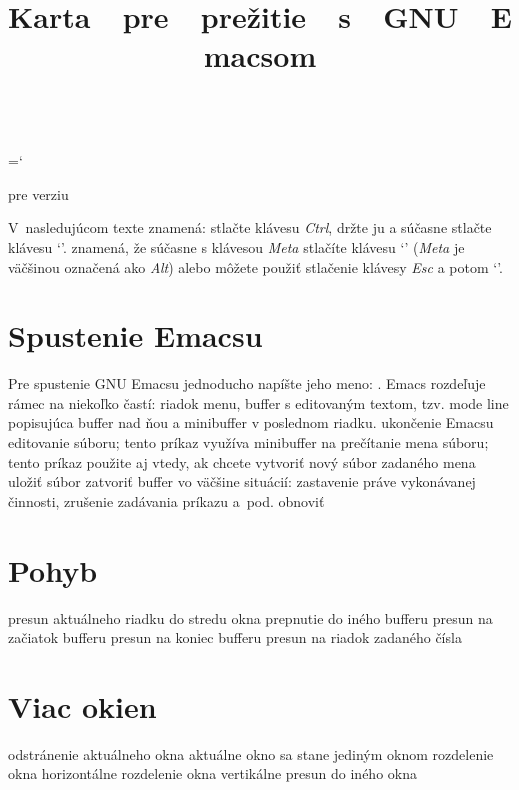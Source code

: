 \chardef\\=`\\

\raggedright
\nopagenumbers
\parindent 0pt
\hoffset -0.2in



\title{Karta\ \ pre\ \ prežitie\ \ s\ \ GNU\ \ Emacsom}{pre verziu \versionemacs}

V~nasledujúcom texte  znamená: stlačte klávesu {\it Ctrl}, držte ju
a súčasne stlačte klávesu `'.  znamená, že
súčasne s klávesou {\it Meta\/} stlačíte klávesu `' ({\it Meta\/} je
väčšinou označená ako {\it Alt\/}) alebo môžete použiť stlačenie
klávesy {\it Esc\/} a potom `'.


\section{Spustenie Emacsu}

Pre spustenie GNU Emacsu jednoducho napíšte jeho meno: .
Emacs rozdeľuje rámec na niekoľko častí:
  riadok menu,
  buffer s editovaným textom,
  tzv. mode line popisujúca buffer nad ňou
  a minibuffer v poslednom riadku.
\askip
{} ukončenie Emacsu
 editovanie súboru; tento príkaz využíva minibuffer na prečítanie
              mena súboru; tento príkaz použite aj vtedy, ak chcete
              vytvoriť nový súbor zadaného mena
 uložiť súbor
 zatvoriť buffer
 vo väčšine situácií: zastavenie práve vykonávanej činnosti,
              zrušenie zadávania príkazu a~pod.
 obnoviť

\section{Pohyb}

 presun aktuálneho riadku do stredu okna
 prepnutie do iného bufferu
 presun na začiatok bufferu
 presun na koniec bufferu
 presun na riadok zadaného čísla

\section{Viac okien}

 odstránenie aktuálneho okna
 aktuálne okno sa stane jediným oknom
 rozdelenie okna horizontálne
 rozdelenie okna vertikálne
 presun do iného okna

